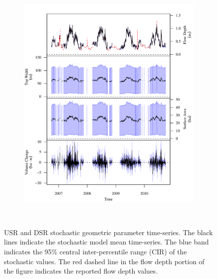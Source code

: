 \begin{linenumbers}
\begin{landscape}
\begin{figure}
\begin{subfigure}{0.7\textwidth}
			\includegraphics[width=\tableCustomSize]{"Figures/Results_USR/Stochastic/G TS B"}
		\end{subfigure}\\
	\caption[USR and DSR stochastic geometric parameter time-series.]{USR and DSR stochastic geometric parameter time-series. The black lines indicate the stochastic model mean time-series.  The blue band indicates the 95\% central inter-percentile range (CIR) of the stochastic values.  The red dashed line in the flow depth portion of the figure indicates the reported flow depth values.}
	\label{fig:GeoTS_US}
	\end{figure}
\end{landscape}
\subfiguremid
\begin{landscape}
	\begin{figure}
		\begin{subfigure}{0.7\textwidth}
			\centering

\end{subfigure}
\end{figure}
\end{landscape}
\end{linenumbers}
